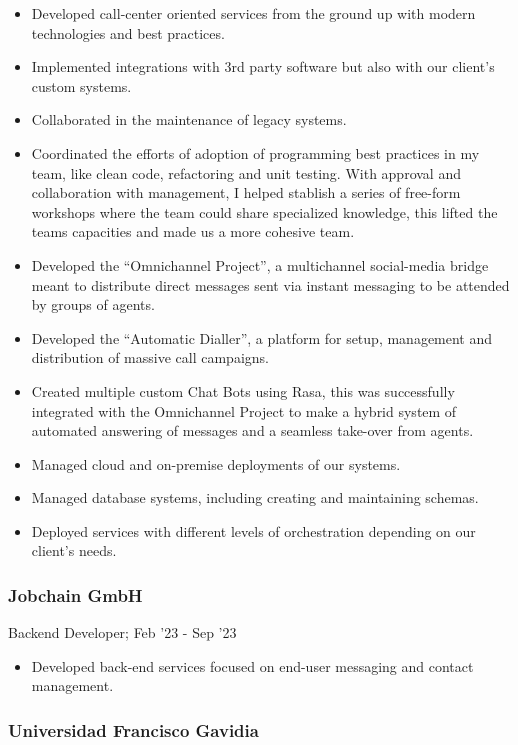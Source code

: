 \documentclass[letterpaper]{article}
\begin{document}
\begin{itemize}
  \item Developed call-center oriented services from the ground up with modern technologies and best practices.
  \item Implemented integrations with 3rd party software but also with our client's custom systems.
  \item Collaborated in the maintenance of legacy systems.
  \item Coordinated the efforts of adoption of programming best practices in my team, like clean code, refactoring and unit testing. With approval and collaboration with management, I helped stablish a series of free-form workshops where the team could share specialized knowledge, this lifted the teams capacities and made us a more cohesive team.
  \item Developed the ``Omnichannel Project'', a multichannel social-media bridge meant to distribute direct messages sent via instant messaging to be attended by groups of agents.
  \item Developed the ``Automatic Dialler'', a platform for setup, management and distribution of massive call campaigns.
  \item Created multiple custom Chat Bots using Rasa, this was successfully integrated with the Omnichannel Project to make a hybrid system of automated answering of messages and a seamless take-over from agents.
  \item Managed cloud and on-premise deployments of our systems.
  \item Managed database systems, including creating and maintaining schemas.
  \item Deployed services with different levels of orchestration depending on our client's needs.
\end{itemize}

\subsubsection{Jobchain GmbH}

Backend Developer; Feb '23 - Sep '23

\begin{itemize}
  \item Developed back-end services focused on end-user messaging and contact management.
\end{itemize}

\subsubsection{Universidad Francisco Gavidia}
\end{document}
